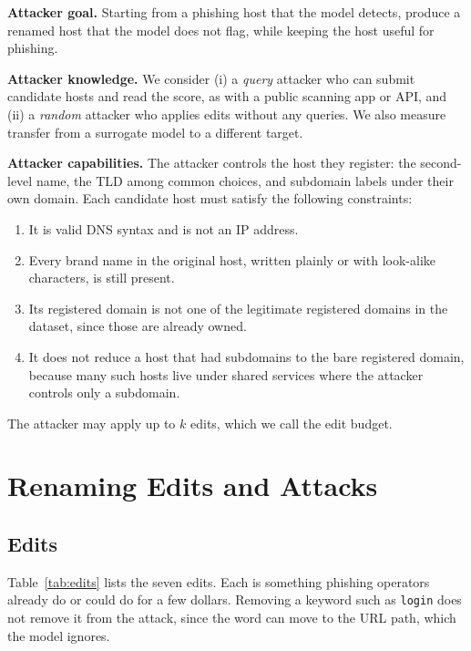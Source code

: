 \documentclass[conference]{IEEEtran}
\begin{document}
\textbf{Attacker goal.} Starting from a phishing host that the model detects, produce a renamed host that the model does not flag, while keeping the host useful for phishing.

\textbf{Attacker knowledge.} We consider (i) a \emph{query} attacker who can submit candidate hosts and read the score, as with a public scanning app or API, and (ii) a \emph{random} attacker who applies edits without any queries. We also measure transfer from a surrogate model to a different target.

\textbf{Attacker capabilities.} The attacker controls the host they register: the second-level name, the TLD among common choices, and subdomain labels under their own domain. Each candidate host must satisfy the following constraints:
\begin{enumerate}
\item It is valid DNS syntax and is not an IP address.
\item Every brand name in the original host, written plainly or with look-alike characters, is still present.
\item Its registered domain is not one of the legitimate registered domains in the dataset, since those are already owned.
\item It does not reduce a host that had subdomains to the bare registered domain, because many such hosts live under shared services where the attacker controls only a subdomain.
\end{enumerate}
The attacker may apply up to $k$ edits, which we call the edit budget.

\section{Renaming Edits and Attacks}

\subsection{Edits}
Table~\ref{tab:edits} lists the seven edits. Each is something phishing operators already do or could do for a few dollars. Removing a keyword such as \texttt{login} does not remove it from the attack, since the word can move to the URL path, which the model ignores.
\end{document}

